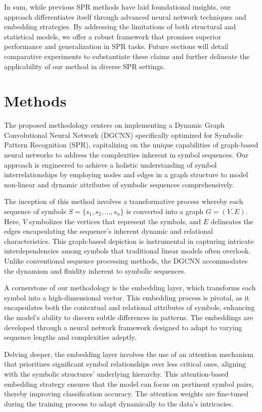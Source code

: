 \documentclass{article}
\begin{document}
In sum, while previous SPR methods have laid foundational insights, our approach differentiates itself through advanced neural network techniques and embedding strategies. By addressing the limitations of both structural and statistical models, we offer a robust framework that promises superior performance and generalization in SPR tasks. Future sections will detail comparative experiments to substantiate these claims and further delineate the applicability of our method in diverse SPR settings.

\section{Methods}
The proposed methodology centers on implementing a Dynamic Graph Convolutional Neural Network (DGCNN) specifically optimized for Symbolic Pattern Recognition (SPR), capitalizing on the unique capabilities of graph-based neural networks to address the complexities inherent in symbol sequences. Our approach is engineered to achieve a holistic understanding of symbol interrelationships by employing nodes and edges in a graph structure to model non-linear and dynamic attributes of symbolic sequences comprehensively.

The inception of this method involves a transformative process whereby each sequence of symbols \( S = \{s_1, s_2, \ldots, s_n\} \) is converted into a graph \( G = (V, E) \). Here, \( V \) symbolizes the vertices that represent the symbols, and \( E \) delineates the edges encapsulating the sequence's inherent dynamic and relational characteristics. This graph-based depiction is instrumental in capturing intricate interdependencies among symbols that traditional linear models often overlook. Unlike conventional sequence processing methods, the DGCNN accommodates the dynamism and fluidity inherent to symbolic sequences.

A cornerstone of our methodology is the embedding layer, which transforms each symbol into a high-dimensional vector. This embedding process is pivotal, as it encapsulates both the contextual and relational attributes of symbols, enhancing the model's ability to discern subtle differences in patterns. The embeddings are developed through a neural network framework designed to adapt to varying sequence lengths and complexities adeptly.

Delving deeper, the embedding layer involves the use of an attention mechanism that prioritizes significant symbol relationships over less critical ones, aligning with the symbolic structures' underlying hierarchy. This attention-based embedding strategy ensures that the model can focus on pertinent symbol pairs, thereby improving classification accuracy. The attention weights are fine-tuned during the training process to adapt dynamically to the data's intricacies.
\end{document}
